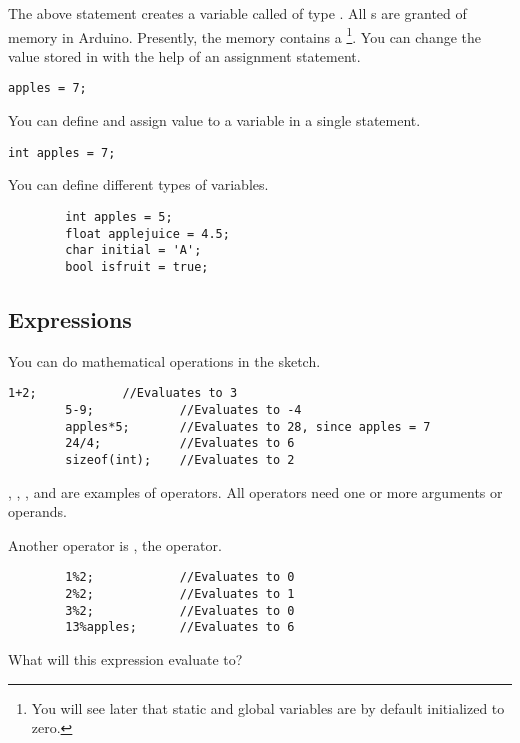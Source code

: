 \documentclass{article}
\begin{document}
		The above statement creates a variable called  of type . All s are granted  of memory in Arduino. Presently, the memory contains a \footnote{You will see later that static and global variables are by default initialized to zero.}. You can change the value stored in  with the help of an assignment statement.

		\begin{lstlisting}[caption={Assignment}, label=assignment]
		apples = 7;
		\end{lstlisting}

		You can define and assign value to a variable in a single statement.

		\begin{lstlisting}[caption={Assignment}, label=assignment]
		int apples = 7;
		\end{lstlisting}

		You can define different types of variables.

		\begin{lstlisting}
		int apples = 5;
		float applejuice = 4.5;
		char initial = 'A';
		bool isfruit = true;
		\end{lstlisting}

	\subsection{Expressions}

		You can do mathematical operations in the sketch.

		\begin{lstlisting}[caption={Expressions}, label=expressions]
		1+2;			//Evaluates to 3
		5-9;			//Evaluates to -4
		apples*5;		//Evaluates to 28, since apples = 7
		24/4;			//Evaluates to 6
		sizeof(int);	//Evaluates to 2
		\end{lstlisting}

		\inlncd{+}, \inlncd{-}, \inlncd{*}, \inlncd{/} and  are examples of operators. All operators need one or more arguments or operands.

		Another operator is \inlncd{\%}, the  operator.

		\begin{lstlisting}
		1%2;			//Evaluates to 0
		2%2;			//Evaluates to 1
		3%2;			//Evaluates to 0
		13%apples;		//Evaluates to 6
		\end{lstlisting}

		What will this expression evaluate to?
\end{document}
